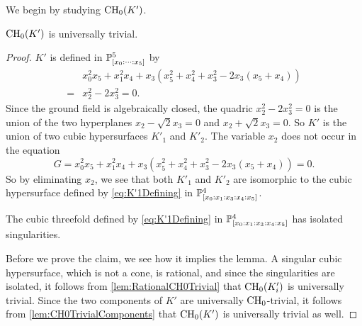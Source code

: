 We begin by studying $\CH_0(K')$.
\begin{lemma}
  \label{lem:K'UniversallyTrivial}
  $\CH_0(K')$ is universally trivial.
\end{lemma}
\begin{proof}
   $K'$ is defined in $\P^5_{[x_0:\dots:x_5]}$ by
\begin{align*}
  &x_0^2x_5 + x_1^2x_4 + x_3(x_5^2 + x_4^2 + x_3^2 - 2x_3(x_5 + x_4))\\
=&x_2^2 - 2x_3^2=0.
\end{align*}
Since the ground field is algebraically closed, the quadric $x_2^2 - 2x_3^2 = 0$ is the union of the two hyperplanes $x_2-\sqrt{2}x_3 = 0$ and $x_2 + \sqrt{2}x_3=0$. So $K'$ is the union of two cubic hypersurfaces $K'_1$ and $K'_2$. The variable $x_2$ does not occur in the equation
\begin{equation}
  \label{eq:K'1Defining}
  G = x_0^2x_5 + x_1^2x_4 + x_3(x_5^2 + x_4^2 + x_3^2 - 2x_3(x_5 + x_4)) = 0.
\end{equation}
So by eliminating $x_2$, we see that both $K'_1$ and $K'_2$ are isomorphic to the cubic hypersurface defined by \eqref{eq:K'1Defining} in $\P^4_{[x_0:x_1:x_3:x_4:x_5]}$.
\begin{claim}
  The cubic threefold defined by \eqref{eq:K'1Defining} in $\P^4_{[x_0:x_1:x_3:x_4:x_5]}$  has isolated singularities.
\end{claim}
Before we prove the claim, we see how it implies the lemma. A singular cubic hypersurface, which is not a cone, is rational, and since the singularities are isolated, it follows from \cref{lem:RationalCH0Trivial} that $\CH_0(K'_i)$ is universally trivial. Since the two components of $K'$ are universally $\CH_0$-trivial,  it follows from \cref{lem:CH0TrivialComponents} that $\CH_0(K')$ is universally trivial as well. 


\end{proof}
